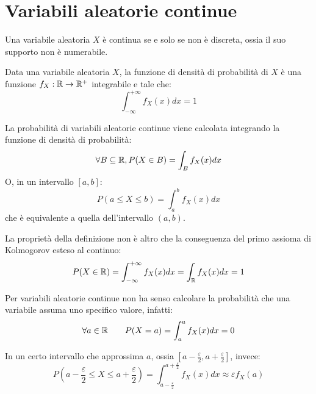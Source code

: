 \section{Variabili aleatorie continue}
\begin{defin}
	Una variabile aleatoria $X$ è continua se e solo se non è discreta, ossia il suo supporto non è numerabile.
\end{defin}

\begin{defin}
	Data una variabile aleatoria $X$, la funzione di densità di probabilità di $X$ è una funzione $f_X:\mathbb R\to\mathbb R^+$ integrabile e tale che:
	\begin{equation*}
		\int_{-\infty}^{+\infty} f_X(x)dx = 1
	\end{equation*}
\end{defin}

La probabilità di variabili aleatorie continue viene calcolata integrando la funzione di densità di probabilità:
\begin{equation*}
	\forall B\subseteq\mathbb R, P(X\in B)=\int_B f_X(x)dx
\end{equation*}
O, in un intervallo $[a,b]$:
\begin{equation*}
	P(a\leq X\leq b)=\int_a^b f_X(x)dx
\end{equation*}
che è equivalente a quella dell'intervallo $(a,b)$.

La proprietà della definizione non è altro che la conseguenza del primo assioma di Kolmogorov esteso al continuo:
\begin{equation*}
	P(X\in\mathbb R) = \int_{-\infty}^{+\infty} f_X(x)dx = \int_\mathbb R f_X(x)dx = 1
\end{equation*}

Per variabili aleatorie continue non ha senso calcolare la probabilità che una variabile assuma uno specifico valore, infatti:
\begin{equation*}
	\forall a\in\mathbb R \qquad P(X=a)=\int_a^a f_X(x)dx=0
\end{equation*}

In un certo intervallo che approssima $a$, ossia $[a-\frac{\varepsilon}{2},a+\frac{\varepsilon}{2}]$, invece:
\begin{equation*}
	P\left(a - \frac{\varepsilon}{2}\leq X\leq a + \frac{\varepsilon}{2}\right) = \int_{a - \frac{\varepsilon}{2}}^{a + \frac{\varepsilon}{2}} f_X(x)dx \approx \varepsilon f_X(a)
\end{equation*}

